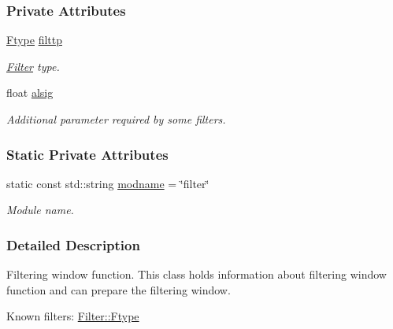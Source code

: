 \subsubsection*{Private Attributes}
\begin{DoxyCompactItemize}
\item 
\hyperlink{classFilter_aa61599baec09f1011f80edc1e9118728}{Ftype} \hyperlink{classFilter_a61675994b19b6e0a6823e18974dd72bb}{filttp}
\begin{DoxyCompactList}\small\item\em \hyperlink{classFilter}{Filter} type. \item\end{DoxyCompactList}\item 
float \hyperlink{classFilter_af2d531fc1caba3f3c9c923a484da3722}{alsig}
\begin{DoxyCompactList}\small\item\em Additional parameter required by some filters. \item\end{DoxyCompactList}\end{DoxyCompactItemize}
\subsubsection*{Static Private Attributes}
\begin{DoxyCompactItemize}
\item 
static const std::string \hyperlink{classFilter_af1862c4a04a13844bd9c9caff1e7fd21}{modname} = \char`\"{}filter\char`\"{}
\begin{DoxyCompactList}\small\item\em Module name. \item\end{DoxyCompactList}\end{DoxyCompactItemize}


\subsubsection{Detailed Description}
Filtering window function. This class holds information about filtering window function and can prepare the filtering window.

Known filters: \hyperlink{classFilter_aa61599baec09f1011f80edc1e9118728}{Filter::Ftype} 

